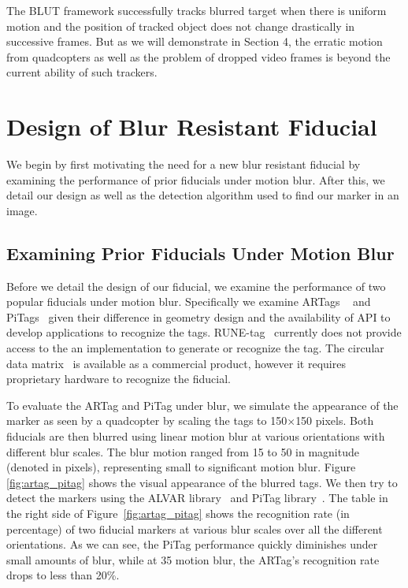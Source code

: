 \documentclass[10pt,twocolumn,letterpaper]{article}
\begin{document}
The BLUT framework successfully tracks blurred target when there is uniform motion
and the position of tracked object does not change drastically in successive
frames. But as we will demonstrate in Section 4, the erratic motion from quadcopters as
well as the problem of dropped video frames is beyond the current ability of such trackers.

\section{Design of Blur Resistant Fiducial}

We begin by first motivating the need for a new blur resistant fiducial by examining
the performance of prior fiducials under motion blur.  After this, we detail
our design as well as the detection algorithm used to find our marker in an image.

\subsection{Examining Prior Fiducials Under Motion Blur}\label{sec:blurtest}

Before we detail the design of our fiducial, we examine the performance of two
popular fiducials under motion blur.  Specifically we examine ARTags
~\cite{Fiala05} and PiTags~\cite{Pitag13} given their difference in geometry
design and the availability of API to develop applications to recognize the tags.
RUNE-tag~\cite{runetag11} currently does not provide access to the an
implementation to generate or recognize the tag.  The circular data
matrix~\cite{NaimarkF02} is available as a commercial product, however it
requires proprietary hardware to recognize the fiducial.

To evaluate the ARTag and PiTag under blur, we simulate the appearance of the
marker as seen by a quadcopter by scaling the tags to 150$\times$150 pixels.
Both fiducials are then blurred using linear motion blur at various
orientations with different blur scales. The blur motion ranged from 15 to 50
in magnitude (denoted in pixels), representing small to significant motion
blur. Figure \ref{fig:artag_pitag} shows the visual appearance of the blurred
tags. We then try to detect the markers using the ALVAR library~\cite{alvar} and
PiTag library~\cite{ros_pitag}. The table in the right side of
Figure~\ref{fig:artag_pitag} shows the recognition rate (in percentage) of two
fiducial markers at various blur scales over all the different orientations.
As we can see, the PiTag performance quickly diminishes under small amounts of
blur, while at 35 motion blur, the ARTag's recognition rate drops to less than
20\%.
\end{document}
